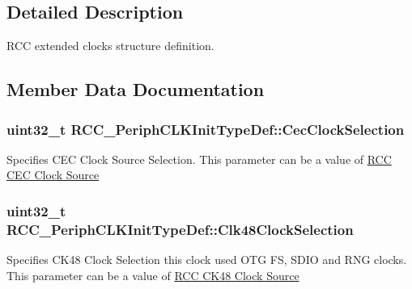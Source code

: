 \subsection{Detailed Description}
R\+CC extended clocks structure definition. 

\subsection{Member Data Documentation}
\subsubsection[{\texorpdfstring{Cec\+Clock\+Selection}{CecClockSelection}}]{\setlength{\rightskip}{0pt plus 5cm}uint32\+\_\+t R\+C\+C\+\_\+\+Periph\+C\+L\+K\+Init\+Type\+Def\+::\+Cec\+Clock\+Selection}\hypertarget{struct_r_c_c___periph_c_l_k_init_type_def_a344e2489c3faf2150fafbafc86b86812}{}\label{struct_r_c_c___periph_c_l_k_init_type_def_a344e2489c3faf2150fafbafc86b86812}
Specifies C\+EC Clock Source Selection. This parameter can be a value of \hyperlink{group___r_c_c_ex___c_e_c___clock___source}{R\+CC C\+EC Clock Source} 
\subsubsection[{\texorpdfstring{Clk48\+Clock\+Selection}{Clk48ClockSelection}}]{\setlength{\rightskip}{0pt plus 5cm}uint32\+\_\+t R\+C\+C\+\_\+\+Periph\+C\+L\+K\+Init\+Type\+Def\+::\+Clk48\+Clock\+Selection}\hypertarget{struct_r_c_c___periph_c_l_k_init_type_def_abcb1d9026f5ad149b6e0d1194f82b852}{}\label{struct_r_c_c___periph_c_l_k_init_type_def_abcb1d9026f5ad149b6e0d1194f82b852}
Specifies C\+K48 Clock Selection this clock used O\+TG FS, S\+D\+IO and R\+NG clocks. This parameter can be a value of \hyperlink{group___r_c_c_ex___c_k48___clock___source}{R\+CC C\+K48 Clock Source} 
